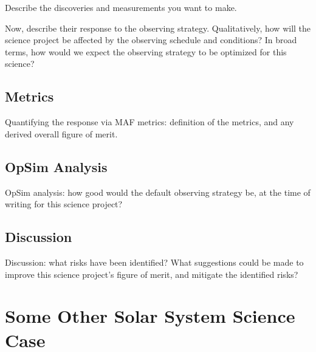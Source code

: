 Describe the discoveries and measurements you want to make.

Now, describe their response to the observing strategy. Qualitatively,
how will the science project be affected by the observing schedule and
conditions? In broad terms, how would we expect the observing strategy
to be optimized for this science?



\subsection{Metrics}
\label{sec:\secname:metrics}

Quantifying the response via MAF metrics: definition of the metrics,
and any derived overall figure of merit.



\subsection{OpSim Analysis}
\label{sec:\secname:analysis}

OpSim analysis: how good would the default observing strategy be, at
the time of writing for this science project?



\subsection{Discussion}
\label{sec:\secname:discussion}

Discussion: what risks have been identified? What suggestions could be
made to improve this science project's figure of merit, and mitigate
the identified risks?



\navigationbar


\section{Some Other Solar System Science Case}
\def\secname{\chpname:discovery}\label{sec:\secname}

